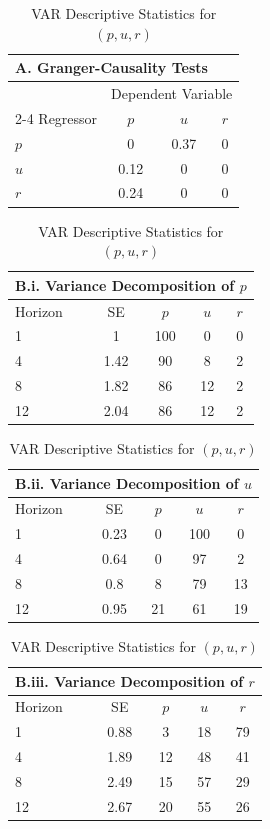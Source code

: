 \begin{table}[!htbp]
\centering
\caption{VAR Descriptive Statistics for $(p,u,r)$}

\begin{tabular}{lccc}
\hline
\multicolumn{4}{l}{\textbf{A. Granger-Causality Tests}} \\
\hline
 & \multicolumn{3}{c}{Dependent Variable} \\
\cline{2-4}
Regressor & $p$ & $u$ & $r$ \\
\hline
$p$ & 0 & 0.37 & 0 \\
$u$ & 0.12 & 0 & 0 \\
$r$ & 0.24 & 0 & 0 \\
\hline
\end{tabular}

\vspace{0.3cm}

\begin{tabular}{lcccc}
\multicolumn{5}{l}{\textbf{B.i. Variance Decomposition of $p$}} \\
\hline
Horizon & SE & $p$ & $u$ & $r$ \\
\hline
1 & 1 & 100 & 0 & 0 \\
4 & 1.42 & 90 & 8 & 2 \\
8 & 1.82 & 86 & 12 & 2 \\
12 & 2.04 & 86 & 12 & 2 \\
\hline
\end{tabular}

\vspace{0.3cm}

\begin{tabular}{lcccc}
\multicolumn{5}{l}{\textbf{B.ii. Variance Decomposition of $u$}} \\
\hline
Horizon & SE & $p$ & $u$ & $r$ \\
\hline
1 & 0.23 & 0 & 100 & 0 \\
4 & 0.64 & 0 & 97 & 2 \\
8 & 0.8 & 8 & 79 & 13 \\
12 & 0.95 & 21 & 61 & 19 \\
\hline
\end{tabular}

\vspace{0.3cm}

\begin{tabular}{lcccc}
\multicolumn{5}{l}{\textbf{B.iii. Variance Decomposition of $r$}} \\
\hline
Horizon & SE & $p$ & $u$ & $r$ \\
\hline
1 & 0.88 & 3 & 18 & 79 \\
4 & 1.89 & 12 & 48 & 41 \\
8 & 2.49 & 15 & 57 & 29 \\
12 & 2.67 & 20 & 55 & 26 \\
\hline
\end{tabular}

\end{table}
